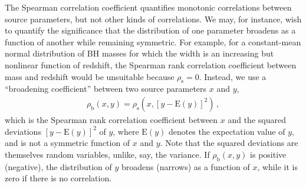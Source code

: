 \begin{refsection}
The Spearman correlation coefficient quantifies monotonic correlations between source parameters, but not other kinds of correlations. We may, for instance, wish to quantify the significance that the distribution of one parameter broadens as a function of another while remaining symmetric. For example, for a constant-mean normal distribution of BH masses for which the width is an increasing but nonlinear function of redshift, the Spearman rank correlation coefficient between mass and redshift would be unsuitable because $\rho_\mathrm{s}=0$. Instead, we use a ``broadening coefficient'' between two source parameters $x$ and $y$,
\begin{align}
\rho_\mathrm{b}(x,y)
=
\rho_\mathrm{s} \left( x , [ y - \mathrm{E}(y) ]^2 \right)
\, ,
\label{eq: broadening}
\end{align}
which is the Spearman rank correlation coefficient between $x$ and the squared deviations $[y-\mathrm{E}(y)]^2$ of $y$, where $\mathrm{E}(y)$ denotes the expectation value of $y$, and is not a symmetric function of $x$ and $y$. Note that the squared deviations are themselves random variables, unlike, say, the variance. If $\rho_\mathrm{b}(x,y)$ is positive (negative), the distribution of $y$ broadens (narrows) as a function of $x$, while it is zero if there is no correlation.


\end{refsection}

